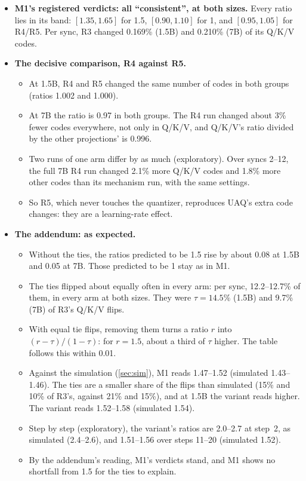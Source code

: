 \documentclass[11pt]{article}
\begin{document}
\begin{itemize}
\item \textbf{M1's registered verdicts: all ``consistent'', at both sizes.} Every ratio lies in its band: $[1.35,1.65]$ for 1.5, $[0.90,1.10]$ for 1, and $[0.95,1.05]$ for R4/R5. Per sync, R3 changed 0.169\% (1.5B) and 0.210\% (7B) of its Q/K/V codes.
\item \textbf{The decisive comparison, R4 against R5.}
  \begin{itemize}
  \item At 1.5B, R4 and R5 changed the same number of codes in both groups (ratios 1.002 and 1.000).
  \item At 7B the ratio is 0.97 in both groups. The R4 run changed about 3\% fewer codes everywhere, not only in Q/K/V, and Q/K/V's ratio divided by the other projections' is 0.996.
  \item Two runs of one arm differ by as much (exploratory). Over syncs 2--12, the full 7B R4 run changed 2.1\% more Q/K/V codes and 1.8\% more other codes than its mechanism run, with the same settings.
  \item So R5, which never touches the quantizer, reproduces UAQ's extra code changes: they are a learning-rate effect.
  \end{itemize}
\item \textbf{The addendum: as expected.}
  \begin{itemize}
  \item Without the ties, the ratios predicted to be 1.5 rise by about 0.08 at 1.5B and 0.05 at 7B. Those predicted to be 1 stay as in M1.
  \item The ties flipped about equally often in every arm: per sync, 12.2--12.7\% of them, in every arm at both sizes. They were $\tau=14.5\%$ (1.5B) and 9.7\% (7B) of R3's Q/K/V flips.
  \item With equal tie flips, removing them turns a ratio $r$ into $(r-\tau)/(1-\tau)$: for $r=1.5$, about a third of $\tau$ higher. The table follows this within 0.01.
  \item Against the simulation (\cref{sec:sim}), M1 reads 1.47--1.52 (simulated 1.43--1.46). The ties are a smaller share of the flips than simulated (15\% and 10\% of R3's, against 21\% and 15\%), and at 1.5B the variant reads higher. The variant reads 1.52--1.58 (simulated 1.54).
  \item Step by step (exploratory), the variant's ratios are 2.0--2.7 at step~2, as simulated (2.4--2.6), and 1.51--1.56 over steps 11--20 (simulated 1.52).
  \item By the addendum's reading, M1's verdicts stand, and M1 shows no shortfall from 1.5 for the ties to explain.
  \end{itemize}
\end{itemize}
\end{document}
